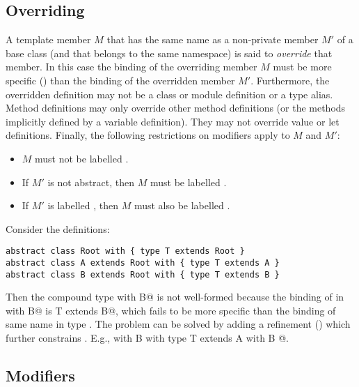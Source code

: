 \documentclass[11pt]{report}
\newcommand{\ifqualified}[1]{}
\newcommand{\iffinaltype}[1]{}
\begin{document}
\begin{itemize}
\subsection{Overriding}
\label{sec:overriding}

A template member $M$ that has the same \ifqualified{qualified} name as a
non-private member $M'$ of a base class (and that belongs to the same
namespace) is said to {\em override} that member.  In this case the
binding of the overriding member $M$ must be more specific
() than the binding of the overridden member $M'$.
Furthermore, the overridden definition may not be a class or module
definition or a type alias.  Method definitions may only override
other method definitions (or the methods implicitly defined by a
variable definition). They may not override value or let definitions.
Finally, the following restrictions on modifiers apply to $M$ and
$M'$:
\begin{itemize}
\item
$M$ must not be labelled \verb@private@.
\item
If $M'$ is not abstract, then $M$ must be labelled \verb@override@.
\item
If $M'$ is labelled \verb@protected@, then $M$ must also be
labelled \verb@protected@.
\iffinaltype{
\item
$M'$ may be labelled \verb@final@ only if it is an abstract type
binding.
}
\end{itemize}

\example\label{ex:compound-a}
Consider the definitions:
\begin{verbatim}
abstract class Root with { type T extends Root }
abstract class A extends Root with { type T extends A }
abstract class B extends Root with { type T extends B }
\end{verbatim}
Then the compound type \verb@A with B@ is not well-formed because the
binding of \verb@T@ in \verb@A with B@ is
\verb@type T extends B@,
which fails to be more specific than the binding of same name in type
\verb@A@. The problem can be solved by adding a refinement
() which further constrains
\verb@T@. E.g., \verb@A with B with { type T extends A with B }@.

\subsection{Modifiers}
\label{sec:modifiers}


\end{itemize}
\end{document}
